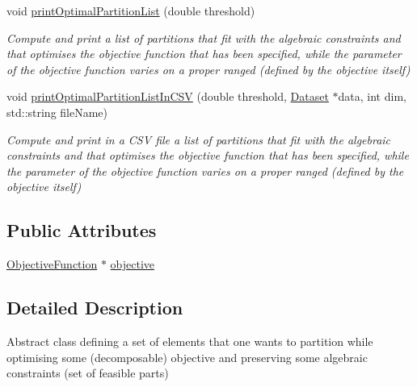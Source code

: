 \begin{DoxyCompactItemize}
void \hyperlink{classAbstractSet_ad8fd35092406335c40914c53ed2e5e34}{print\-Optimal\-Partition\-List} (double threshold)
\begin{DoxyCompactList}\small\item\em Compute and print a list of partitions that fit with the algebraic constraints and that optimises the objective function that has been specified, while the parameter of the objective function varies on a proper ranged (defined by the objective itself) \end{DoxyCompactList}\item 
void \hyperlink{classAbstractSet_ab72fbc5c1f339bb385d24565fd26d4fc}{print\-Optimal\-Partition\-List\-In\-C\-S\-V} (double threshold, \hyperlink{classDataset}{Dataset} $\ast$data, int dim, std\-::string file\-Name)
\begin{DoxyCompactList}\small\item\em Compute and print in a C\-S\-V file a list of partitions that fit with the algebraic constraints and that optimises the objective function that has been specified, while the parameter of the objective function varies on a proper ranged (defined by the objective itself) \end{DoxyCompactList}\end{DoxyCompactItemize}
\subsection*{Public Attributes}
\begin{DoxyCompactItemize}
\item 
\hyperlink{classObjectiveFunction}{Objective\-Function} $\ast$ \hyperlink{classAbstractSet_a0217447a042827703e1ea7655f0fc099}{objective}
\end{DoxyCompactItemize}


\subsection{Detailed Description}
Abstract class defining a set of elements that one wants to partition while optimising some (decomposable) objective and preserving some algebraic constraints (set of feasible parts) 

